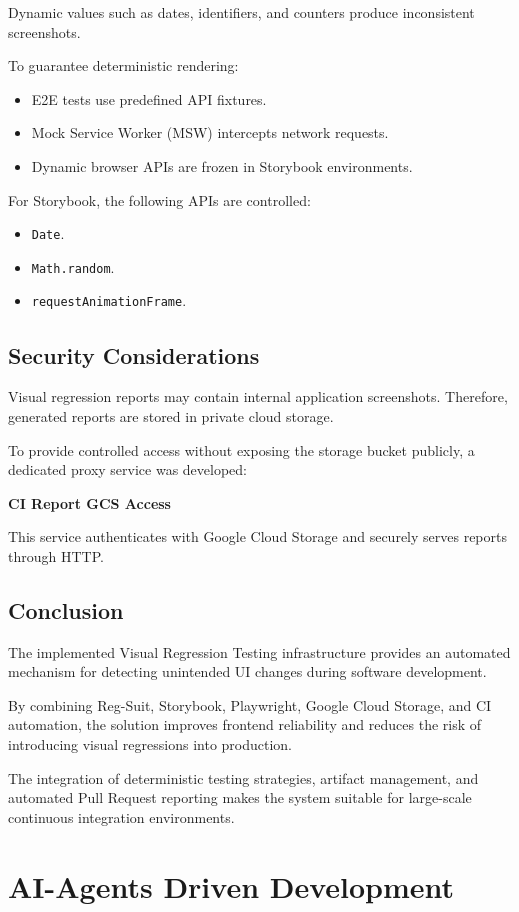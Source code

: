 Dynamic values such as dates, identifiers, and counters produce inconsistent screenshots.

To guarantee deterministic rendering:

\begin{itemize}
    \item E2E tests use predefined API fixtures.
    \item Mock Service Worker (MSW) intercepts network requests.
    \item Dynamic browser APIs are frozen in Storybook environments.
\end{itemize}

For Storybook, the following APIs are controlled:

\begin{itemize}
    \item \texttt{Date}.
    \item \texttt{Math.random}.
    \item \texttt{requestAnimationFrame}.
\end{itemize}


\subsection{Security Considerations}

Visual regression reports may contain internal application screenshots. Therefore, generated reports are stored in private cloud storage.

To provide controlled access without exposing the storage bucket publicly, a dedicated proxy service was developed:

\textbf{CI Report GCS Access}

This service authenticates with Google Cloud Storage and securely serves reports through HTTP.


\subsection{Conclusion}

The implemented Visual Regression Testing infrastructure provides an automated mechanism for detecting unintended UI changes during software development.

By combining Reg-Suit, Storybook, Playwright, Google Cloud Storage, and CI automation, the solution improves frontend reliability and reduces the risk of introducing visual regressions into production.

The integration of deterministic testing strategies, artifact management, and automated Pull Request reporting makes the system suitable for large-scale continuous integration environments.


\section{AI-Agents Driven Development}

\clearpage
